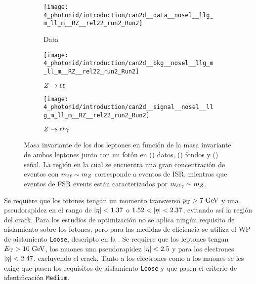 \begin{figure}[ht!]
    \centering
    \begin{subfigure}[h]{0.32\linewidth}
        \centering
        \texttt{[image: 4\_photonid/introduction/can2d\_\_data\_\_nosel\_\_llg\_m\_ll\_m\_\_RZ\_\_rel22\_run2\_Run2]}
        \caption{Data}
        \label{fig:pid_ss:event_selection:mll_mlly_distribution:data}
    \end{subfigure}
    \hfill
    \begin{subfigure}[h]{0.32\linewidth}
        \centering
        \texttt{[image: 4\_photonid/introduction/can2d\_\_bkg\_\_nosel\_\_llg\_m\_ll\_m\_\_RZ\_\_rel22\_run2\_Run2]}
        \caption{\(Z\rightarrow \ell\ell\)}
        \label{fig:pid_ss:event_selection:mll_mlly_distribution:bkg}
    \end{subfigure}
    \hfill
    \begin{subfigure}[h]{0.32\linewidth}
        \centering
        \texttt{[image: 4\_photonid/introduction/can2d\_\_signal\_\_nosel\_\_llg\_m\_ll\_m\_\_RZ\_\_rel22\_run2\_Run2]}
        \caption{\(Z\rightarrow \ell\ell\gamma\)}
        \label{fig:pid_ss:event_selection:mll_mlly_distribution:signal}
    \end{subfigure}
    \caption{Masa invariante de los dos leptones en función de la masa invariante de ambos leptones junto con un fotón en () datos, () fondos y () señal. La región en la cual se encuentra una gran concentración de eventos con \(m_{\ell\ell} \sim m_{Z}\) corresponde a eventos de \ac{ISR}, mientras que eventos de \ac{FSR} events están caracterizados por \(m_{\ell\ell\gamma} \sim m_{Z}\).}
    \label{fig:pid_ss:event_selection:mll_mlly_distribution}
\end{figure}

Se requiere que los fotones tengan un momento transverso \(p_{\text{T}}>7~\text{GeV}\) y una pseudorapidez en el rango de \(|\eta|<1.37\) o \(1.52<\abseta<2.37\), evitando así la región del crack.
Para los estudios de optimización no se aplica ningún requisito de aislamiento sobre los fotones, pero para las medidas de eficiencia se utiliza el \ac{WP} de aislamiento \texttt{Loose}, descripto en la \Sect{\ref{subsec:objects:egamma:iso}}. Se requiere que los leptones tengan \(E_{\text{T}}>10~\text{GeV}\), los muones una pseudorapidez \(|\eta|<2.5\) y para los electrones \(|\eta|<2.47\), excluyendo el crack. Tanto a los electrones como a los muones se les exige que pasen los requisitos de aislamiento \texttt{Loose} y que pasen el criterio de identificación \texttt{Medium}.

